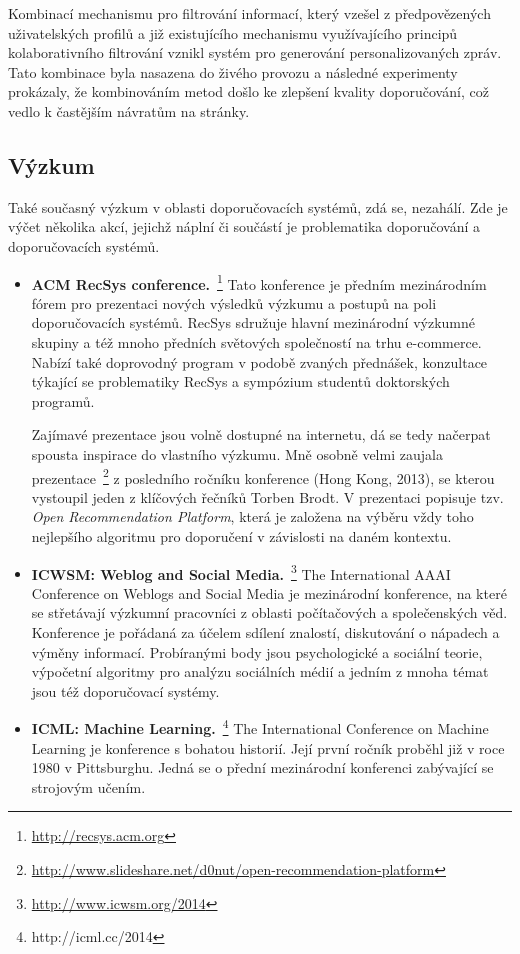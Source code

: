 \documentclass[thesis=M,czech]{FITthesis}[2014/05/07]
\begin{document}
Kombinací mechanismu pro filtrování informací, který vzešel z předpovězených uživatelských profilů a již existujícího mechanismu využívajícího principů kolaborativního filtrování vznikl systém pro generování personalizovaných zpráv. Tato kombinace byla nasazena do živého provozu a následné experimenty prokázaly, že kombinováním metod došlo ke zlepšení kvality doporučování, což vedlo k častějším návratům na stránky.

\subsection{Výzkum}

Také současný výzkum v oblasti doporučovacích systémů, zdá se, nezahálí. Zde je výčet několika akcí, jejichž náplní či součástí je problematika doporučování a doporučovacích systémů.

\begin{itemize}
  \item \textbf{ACM RecSys conference.}~\footnote{\url{http://recsys.acm.org}} Tato konference je předním mezinárodním fórem pro prezentaci nových výsledků výzkumu a postupů na poli doporučovacích systémů. RecSys sdružuje hlavní mezinárodní výzkumné skupiny a též mnoho předních světových společností na trhu e-commerce. Nabízí také doprovodný program v podobě zvaných přednášek, konzultace týkající se problematiky RecSys a sympózium studentů doktorských programů. 
  
  Zajímavé prezentace jsou volně dostupné na internetu, dá se tedy načerpat spousta inspirace do vlastního výzkumu. Mně osobně velmi zaujala prezentace~\footnote{\url{http://www.slideshare.net/d0nut/open-recommendation-platform}} z posledního ročníku konference (Hong Kong, 2013), se kterou vystoupil jeden z klíčových řečníků Torben Brodt. V prezentaci popisuje tzv. \emph{Open Recommendation Platform}, která je založena na výběru vždy toho nejlepšího algoritmu pro doporučení v závislosti na daném kontextu. 
  
  \item \textbf{ICWSM: Weblog and Social Media.}~\footnote{\url{http://www.icwsm.org/2014}} The International AAAI Conference on Weblogs and Social Media je mezinárodní konference, na které se střetávají výzkumní pracovníci z oblasti počítačových a společenských věd. Konference je pořádaná za účelem sdílení znalostí, diskutování o nápadech a výměny informací. Probíranými body jsou psychologické a sociální teorie, výpočetní algoritmy pro analýzu sociálních médií a jedním z mnoha témat jsou též doporučovací systémy.
  \item \textbf{ICML: Machine  Learning.}~\footnote{http://icml.cc/2014} The International Conference on Machine Learning je konference s bohatou historií. Její první ročník proběhl již v roce 1980 v Pittsburghu. Jedná se o přední mezinárodní konferenci zabývající se strojovým učením. 
\end{itemize}
\end{document}
